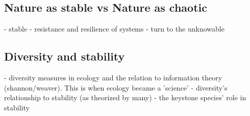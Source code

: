 \subsection{Nature as stable vs Nature as chaotic}

- stable \cite{odum_1953} 
- resistance and resilience of systems \cite{holling_1973}
- turn to the unknowable\cite{barbour_1996}

\subsection{Diversity and stability}

- diversity measures in ecology and the relation to information theory (shannon/weaver). This is when ecology became a 'science'
- diversity's relationship to stability (as theorized by many)
- the keystone species' role in stability


